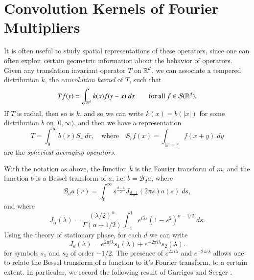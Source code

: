 \section{Convolution Kernels of Fourier Multipliers}

It is often useful to study spatial representations of these operators, since one can often exploit certain geometric information about the behavior of operators. Given any translation invariant operator $T$ on $\operatorname{\mathbb{R}}^d$, we can associate a tempered distribution $k$, the \emph{convolution kernel} of $T$, such that
%
\begin{equation}
  Tf(y) = \int_{\operatorname{\mathbb{R}}^d} k(x) f(y-x)\; dx \quad\quad\text{for all $f \in \mathcal{S}(\operatorname{\mathbb{R}}^d)$}.
\end{equation}
%
If $T$ is radial, then so is $k$, and so we can write $k(x) = b(|x|)$ for some distribution $b$ on $[0,\infty)$, and then we have a representation
%
\begin{equation}
  T = \int_0^\infty b(r) S_r\; dr,\quad\text{where}\quad S_rf(x) = \int_{|y| = r} f(x + y)\; dy 
\end{equation}
%
are the \emph{spherical averaging operators}.

With the notation as above, the function $k$ is the Fourier transform of $m$, and the function $b$ is a Bessel transform of $a$, i.e. $b = \mathcal{B}_d a$, where
%
\begin{equation}
  \mathcal{B}_d a(r) = \int_0^\infty s^{\frac{d-1}{2}} J_{\frac{d-1}{2}}(2 \pi s) a(s)\; ds,
\end{equation}
%
%
and where
%
\begin{equation}
  J_\alpha(\lambda) = \frac{(\lambda / 2)^\alpha}{\Gamma(\alpha + 1/2)} \int_{-1}^1 e^{i \lambda s} (1 - s^2)^{\alpha - 1/2}\; ds.
\end{equation}
%
Using the theory of stationary phase, for each $d$ we can write
%
\begin{equation}
  J_d(\lambda) = e^{2 \pi i \lambda} s_1(\lambda) + e^{-2 \pi i \lambda} s_2(\lambda).
\end{equation}
%
for symbols $s_1$ and $s_2$ of order $-1/2$. The presence of $e^{2 \pi i \lambda}$ and $e^{-2 \pi i \lambda}$ allows one to relate the Bessel transform of a function to it's Fourier transform, to a certain extent. In particular, we record the following result of Garrigos and Seeger \cite{GarrigosandSeeger}.

